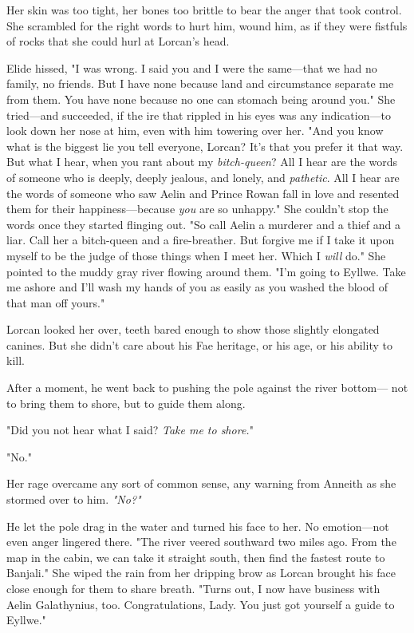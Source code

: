 Her skin was too tight, her bones too brittle to bear the anger that took control. She scrambled for the right words to hurt him, wound him, as if they were fistfuls of rocks that she could hurl at Lorcan's head.

Elide hissed, "I was wrong. I said you and I were the same---that we had no family, no friends. But I have none because land and circumstance separate me from them. You have none because no one can stomach being around you." She tried---and succeeded, if the ire that rippled in his eyes was any indication---to look down her nose at him, even with him towering over her. "And you know what is the biggest lie you tell everyone, Lorcan? It's that you prefer it that way. But what I hear, when you rant about my \emph{bitch-queen}? All I hear are the words of someone who is deeply, deeply jealous, and lonely, and \emph{pathetic}. All I hear are the words of someone who saw Aelin and Prince Rowan fall in love and resented them for their happiness---because \emph{you} are so unhappy." She couldn't stop the words once they started flinging out. "So call Aelin a murderer and a thief and a liar. Call her a bitch-queen and a fire-breather. But forgive me if I take it upon myself to be the judge of those things when I meet her. Which I \emph{will}
do." She pointed to the muddy gray river flowing around them. "I'm going to Eyllwe. Take me ashore and I'll wash my hands of you as easily as you washed the blood of that man off yours."

Lorcan looked her over, teeth bared enough to show those slightly elongated canines. But she didn't care about his Fae heritage, or his age, or his ability to kill.

After a moment, he went back to pushing the pole against the river bottom--- not to bring them to shore, but to guide them along.

"Did you not hear what I said? \emph{Take me to shore.}"

"No."

Her rage overcame any sort of common sense, any warning from Anneith as she stormed over to him. \emph{"No?"}

He let the pole drag in the water and turned his face to her. No emotion---not even anger lingered there. "The river veered southward two miles ago. From the map in the cabin, we can take it straight south, then find the fastest route to Banjali." She wiped the rain from her dripping brow as Lorcan brought his face close enough for them to share breath. "Turns out, I now have business with Aelin Galathynius, too. Congratulations, Lady. You just got yourself a guide to Eyllwe."

